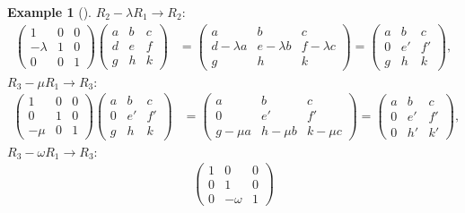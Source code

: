 \documentclass[
  a4paper,
  DIV=11,
  numbers=noendperiod,
  oneside]{scrreprt}
\theoremstyle{definition}
\newtheorem{example}{Example}[chapter]
\theoremstyle{remark}
\begin{document}
\begin{example}[]
\(R_2-\lambda R_1 \rightarrow R_2\): \[\begin{aligned}
\left(\begin{array}{rrr}
1 & 0 & 0 \\
-\lambda & 1 & 0 \\
0 & 0 & 1
\end{array}\right)
\left(\begin{array}{rrr}
a & b & c\\
d & e & f \\
g & h & k
\end{array}\right) &=
\left(\begin{array}{rrr}
a & b & c \\
d-\lambda a & e-\lambda b & f-\lambda c \\
g & h & k
\end{array}\right) =
\left(\begin{array}{rrr}
a & b & c \\
0 & e' & f' \\
g & h & k
\end{array}\right),
\end{aligned}\] \(R_3-\mu R_1 \rightarrow R_3\): \[\begin{aligned}
\left(\begin{array}{rrr}
1 & 0 & 0 \\
0 & 1 & 0 \\
-\mu & 0 & 1
\end{array}\right)
\left(\begin{array}{rrr}
a & b & c\\
0 & e' & f' \\
g & h & k
\end{array}\right) &=
\left(\begin{array}{rrr}
a & b & c \\
0 & e' & f' \\
g-\mu a & h-\mu b & k-\mu c
\end{array}\right) =
\left(\begin{array}{rrr}
a & b & c \\
0 & e' & f' \\
0 & h' & k'
\end{array}\right),
\end{aligned}\] \(R_3-\omega R_1\rightarrow R_3\): \[\begin{aligned}
\left(\begin{array}{rrr}
1 & 0 & 0 \\
0 & 1 & 0 \\
0 & -\omega & 1
\end{array}\right)

\end{aligned}\]
\end{example}
\end{document}
